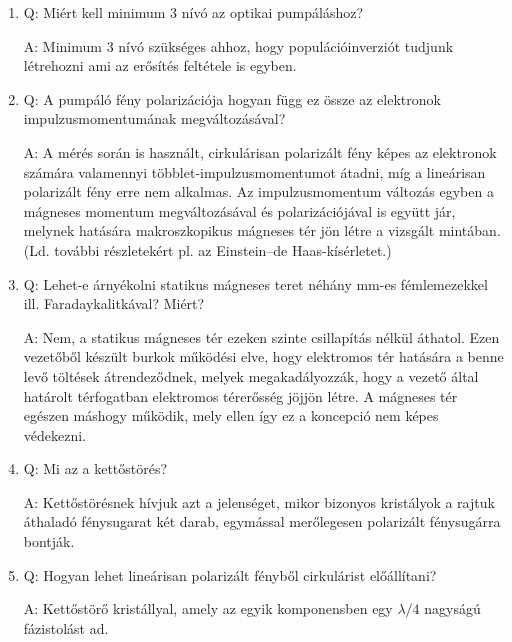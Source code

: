 \begin{enumerate}
    \item Q: Miért kell minimum 3 nívó az optikai pumpáláshoz?
    \begin{displayquote}
    	A: Minimum $3$ nívó szükséges ahhoz, hogy populációinverziót tudjunk létrehozni ami az erősítés feltétele is egyben.
    \end{displayquote}
    
    \item Q: A pumpáló fény polarizációja hogyan függ ez össze az elektronok impulzusmomentumának megváltozásával?
    \begin{displayquote}
    	A: A mérés során is használt, cirkulárisan polarizált fény képes az elektronok számára valamennyi többlet-impulzusmomentumot átadni, míg a lineárisan polarizált fény erre nem alkalmas. Az impulzusmomentum változás egyben a mágneses momentum megváltozásával és polarizációjával is együtt jár, melynek hatására makroszkopikus mágneses tér jön létre a vizsgált mintában. (Ld. további részletekért pl. az Einstein--de Haas-kísérletet.)
    \end{displayquote}
    
    \item Q: Lehet-e árnyékolni statikus mágneses teret néhány mm-es fémlemezekkel ill. Faradaykalitkával? Miért?
    \begin{displayquote}
    	A: Nem, a statikus mágneses tér ezeken szinte csillapítás nélkül áthatol. Ezen vezetőből készült burkok működési elve, hogy elektromos tér hatására a benne levő töltések átrendeződnek, melyek megakadályozzák, hogy a vezető által határolt térfogatban elektromos térerősség jöjjön létre. A mágneses tér egészen máshogy működik, mely ellen így ez a koncepció nem képes védekezni.
    \end{displayquote}
    
    \item Q: Mi az a kettőstörés?
    \begin{displayquote}
    	A: Kettőstörésnek hívjuk azt a jelenséget, mikor bizonyos kristályok a rajtuk áthaladó fénysugarat két darab, egymással merőlegesen polarizált fénysugárra bontják.
    \end{displayquote}
    
    \item Q: Hogyan lehet lineárisan polarizált fényből cirkulárist előállítani?
    \begin{displayquote}
    	A: Kettőstörő kristállyal, amely az egyik komponensben egy $\lambda/4$ nagyságú fázistolást ad.
    \end{displayquote}
    

\end{enumerate}
